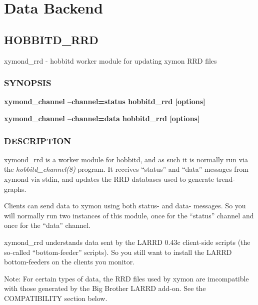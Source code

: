 %
\chapter{Data Backend}
\section{HOBBITD\_RRD}

 xymond\_rrd - hobbitd worker module for updating xymon RRD files

\subsection{SYNOPSIS}
\textbf{xymond\_channel --channel=status hobbitd\_rrd [options]}
 
\textbf{xymond\_channel --channel=data hobbitd\_rrd [options]}


 
\subsection{DESCRIPTION}
 xymond\_rrd is a worker module for hobbitd, and as such it is normally run via the \emph{hobbitd\_channel(8)}
 program. It receives ``status'' and ``data'' messages from xymond via stdin, and updates the RRD databases used to generate trend-graphs. 

  Clients can send data to xymon using both status- and data- messages. So you will normally run two instances of this module, once for the ``status'' channel and once for the ``data'' channel. 


  xymond\_rrd understands data sent by the LARRD 0.43c client-side scripts (the so-called ``bottom-feeder'' scripts). So you still want to install the LARRD bottom-feeders on the clients you monitor. 


  Note: For certain types of data, the RRD files used by xymon are imcompatible with those generated by the Big Brother LARRD add-on. See the COMPATIBILITY section below. 


 


 
